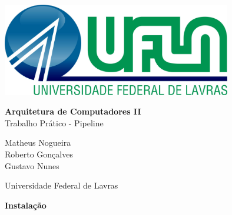 \documentclass{article}
\begin{document}
    \begin{center}
	    \includegraphics[width=100mm,scale=1]{logo-ufla.jpg}	 
    \end{center}
    	 \vspace{1cm}
    \begin{center}
        \huge\textbf{Arquitetura de Computadores II}
        \vspace{3cm}\\
       \Large{ Trabalho Prático - Pipeline}\\
        \vspace{2cm}
        \end{center}
       \Large{ Matheus Nogueira\\
       Roberto Gonçalves\\
       Gustavo Nunes\\}
   
        \vspace{3cm}
        \begin{center}
        \huge Universidade Federal de Lavras
        \end{center}
 
    \clearpage
	\begin{center}
	\Large\textbf{Instalação}
	\end{center}
	
\end{document}
